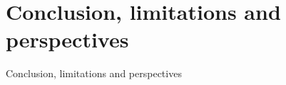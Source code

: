 \section{Conclusion, limitations and perspectives}

\begin{frame}{Conclusion, limitations and perspectives}
	\todo


\end{frame}
